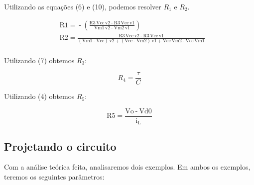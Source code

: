 Utilizando as equações (6) e (10), podemos resolver $R_1$ e $R_2$.

\begin{equation}
    \begin{aligned}
         & \ensuremath{\mathrm{R1}}\operatorname{=}\operatorname{-}\left( \frac{\ensuremath{\mathrm{R3}}\, \ensuremath{\mathrm{Vcc}}\, \ensuremath{\mathrm{v2}}\operatorname{-}\ensuremath{\mathrm{R3}}\, \ensuremath{\mathrm{Vcc}}\, \ensuremath{\mathrm{v1}}}{\ensuremath{\mathrm{Vm1}}\, \ensuremath{\mathrm{v2}}\operatorname{-}\ensuremath{\mathrm{Vm2}}\, \ensuremath{\mathrm{v1}}}\right)                                                                                                                                                                                                                             \\
         & \ensuremath{\mathrm{R2}}\operatorname{=}\frac{\ensuremath{\mathrm{R3}}\, \ensuremath{\mathrm{Vcc}}\, \ensuremath{\mathrm{v2}}\operatorname{-}\ensuremath{\mathrm{R3}}\, \ensuremath{\mathrm{Vcc}}\, \ensuremath{\mathrm{v1}}}{\left( \ensuremath{\mathrm{Vm1}}\operatorname{-}\ensuremath{\mathrm{Vcc}}\right) \, \ensuremath{\mathrm{v2}}\operatorname{+}\left( \ensuremath{\mathrm{Vcc}}\operatorname{-}\ensuremath{\mathrm{Vm2}}\right) \, \ensuremath{\mathrm{v1}}\operatorname{+}\ensuremath{\mathrm{Vcc}}\, \ensuremath{\mathrm{Vm2}}\operatorname{-}\ensuremath{\mathrm{Vcc}}\, \ensuremath{\mathrm{Vm1}}} \\
    \end{aligned}
\end{equation}

Utilizando (7) obtemos $R_3$:

\begin{equation}
    R_4=\frac{\tau}{C}
\end{equation}

Utilizando (4) obtemos $R_5$:

\begin{equation}
    \ensuremath{\mathrm{R5}}\operatorname{=}\frac{\ensuremath{\mathrm{Vo}}\operatorname{-}\ensuremath{\mathrm{Vd0}}}{\ensuremath{\mathrm{i_L}}}
\end{equation}


\subsection{Projetando o circuito}

Com a análise teórica feita, analisaremos dois exemplos. Em ambos os exemplos, teremos os seguintes parâmetros:


